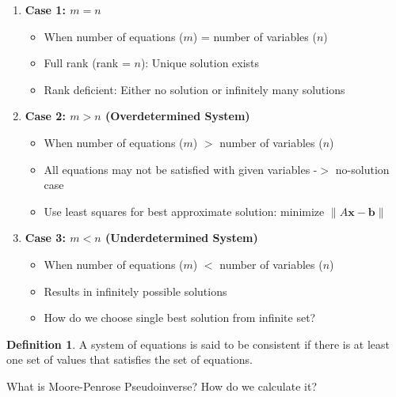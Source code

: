 \documentclass[11pt,a4paper]{article}
\theoremstyle{definition}
\newtheorem{definition}{Definition}[section]
\begin{document}
\begin{defbox}
\begin{enumerate}
    \item \textbf{Case 1: $m = n$ }
    \begin{itemize}
        \item When number of equations ($m$) = number of variables ($n$)
        \item Full rank (rank = $n$): Unique solution exists
        \item Rank deficient: Either no solution or infinitely many solutions
    \end{itemize}
    
    \item \textbf{Case 2: $m > n$ (Overdetermined System)}
    \begin{itemize}
        \item When number of equations ($m$) $>$ number of variables ($n$)
        \item All equations may not be satisfied with given variables -$>$ no-solution case
        \item Use least squares for best approximate solution: minimize $\|A\mathbf{x} - \mathbf{b}\|$
    \end{itemize}
    
    \item \textbf{Case 3: $m < n$ (Underdetermined System)}
    \begin{itemize}
        \item When number of equations ($m$) $<$ number of variables ($n$)
        \item Results in infinitely possible solutions
        \item How do we choose single best solution from infinite set?
    \end{itemize}
\end{enumerate}

\end{defbox}

\begin{defbox}
\begin{definition}
A system of equations is said to be consistent if there is at least one set of values that satisfies the set of equations.
\end{definition}
\end{defbox}

\begin{quesbox}
    What is Moore-Penrose Pseudoinverse? How do we calculate it?
\end{quesbox}
\end{document}
